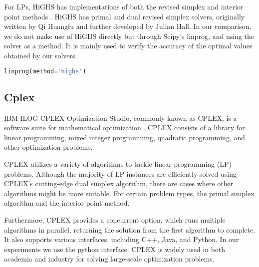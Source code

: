 For LPs, HiGHS has implementations of both the revised simplex and interior point methods
\parencite{Huangfu2018}.
HiGHS has primal and
dual revised simplex solvers, originally written by Qi Huangfu and
further developed by Julian Hall.
In our comparison, we do not make use of HiGHS directly but through Scipy's linprog, and using the solver as a method. It is mainly used to verify the accuracy of the optimal values
obtained by our solvers.

\begin{lstlisting}[language=Python]
    linprog(method='highs')
\end{lstlisting}

\subsection{Cplex}
IBM ILOG CPLEX Optimization Studio, commonly known as CPLEX,
is a software suite for mathematical optimization \parencite{cplex2009v12}.
CPLEX consists of a library for linear programming,
mixed integer programming, quadratic programming, and other optimization problems.

CPLEX utilizes a variety of algorithms to tackle linear programming (LP) problems.
Although the majority of LP instances are efficiently solved using CPLEX's
cutting-edge dual simplex algorithm, there are cases where other algorithms might be more suitable.
For certain problem types, the primal simplex algorithm and the interior point method.

Furthermore, CPLEX provides a concurrent option, which runs multiple algorithms in parallel,
returning the solution from the first algorithm to complete.
It also supports various interfaces, including C++, Java, and Python. In our experiments
we use the python interface.
CPLEX is widely used in both academia and industry for solving large-scale optimization
problems.
